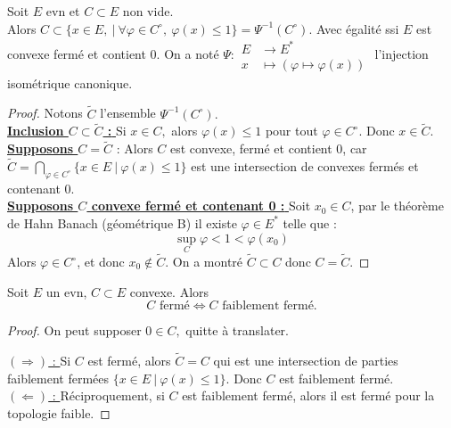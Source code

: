 \begin{propriete}
    Soit $E$ evn et $C \subset E$ non vide. \\
    Alors  $C \subset \{x\in E,\ |\ \forall \varphi \in C^\circ,\ \varphi (x)\le 1 \} =\Psi ^{-1} \left( C^\circ \right) . $ Avec égalité ssi $E$ est convexe fermé et contient 0. On a noté $\Psi :\begin{aligned}
        E &\longrightarrow E^* \\
        x &\longmapsto \left( \varphi \mapsto \varphi (x) \right)
    \end{aligned}$ l'injection isométrique canonique.
\end{propriete}
\begin{proof}
    Notons $\tilde{C}$ l'ensemble $\Psi ^{-1} \left( C^\circ \right).$ \\
    
\underline{\textbf{Inclusion $C \subset \tilde{C}$ : }} Si $x\in C,$ alors $\varphi (x)\le 1$ pour tout $\varphi \in C^\circ$. Donc $x\in \tilde{C}.$ \\

\underline{\textbf{Supposons $C=\tilde{C}$}} : Alors $C$ est convexe, fermé et contient 0, car $\tilde{C}=\bigcap\limits_{\varphi \in C^\circ}  \{x\in E\ |\ \varphi (x)\le 1\} $ est une intersection de convexes fermés et contenant 0.\\

\underline{\textbf{Supposons $C$ convexe fermé et contenant 0 : }} Soit $x_0\in C$, par le théorème de Hahn Banach (géométrique B) il existe $\varphi \in E^*$ telle que : $$\sup_C \varphi <1<\varphi (x_0)$$ 
Alors $\varphi \in C^\circ$, et donc $x_0\not\in \tilde{C}.$ On a montré $\tilde{C}\subset C$ donc $C=\tilde{C}.$
\end{proof}
\begin{corollaire}
    Soit $E$ un evn, $C \subset E$ convexe. Alors
    $$C \text{ fermé}\Leftrightarrow C \text{ faiblement fermé.}$$
\end{corollaire}
\begin{proof}
   On peut supposer $0\in C,$ quitte à translater. 
   
   \underline{$(\Rightarrow)$ : } Si $C$ est fermé, alors $\tilde{C}=C$ qui est une intersection de parties faiblement fermées $\{x\in E\ |\ \varphi (x)\le 1\} .$ Donc $C$ est faiblement fermé.\\
   
   \underline{$(\Leftarrow)$ : } Réciproquement, si $C$ est faiblement fermé, alors il est fermé pour la topologie faible.
\end{proof}
